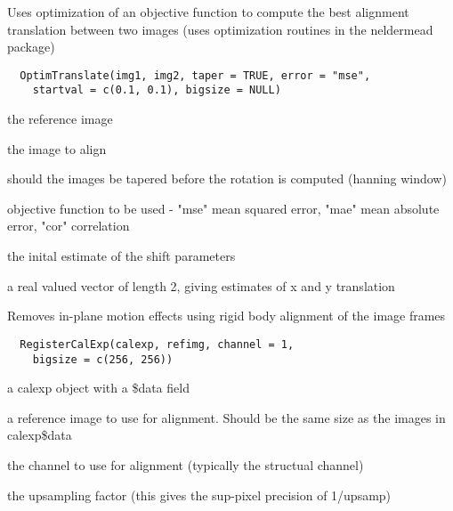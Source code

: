 \documentclass[a4paper]{book}
\begin{document}
%
\begin{Description}\relax
Uses optimization of an objective function to compute the
best alignment translation between two images (uses
optimization routines in the neldermead package)
\end{Description}
%
\begin{Usage}
\begin{verbatim}
  OptimTranslate(img1, img2, taper = TRUE, error = "mse",
    startval = c(0.1, 0.1), bigsize = NULL)
\end{verbatim}
\end{Usage}
%
\begin{Arguments}
\begin{ldescription}
\item[\code{img1}] the reference image

\item[\code{img2}] the image to align

\item[\code{taper}] should the images be tapered before the
rotation is computed (hanning window)

\item[\code{error}] objective function to be used - "mse" mean
squared error, "mae" mean absolute error, "cor"
correlation

\item[\code{startval}] the inital estimate of the shift
parameters
\end{ldescription}
\end{Arguments}
%
\begin{Value}
a real valued vector of length 2, giving estimates of x
and y translation
\end{Value}
%
\begin{Description}\relax
Removes in-plane motion effects using rigid body
alignment of the image frames
\end{Description}
%
\begin{Usage}
\begin{verbatim}
  RegisterCalExp(calexp, refimg, channel = 1,
    bigsize = c(256, 256))
\end{verbatim}
\end{Usage}
%
\begin{Arguments}
\begin{ldescription}
\item[\code{calexp}] a calexp object with a \bsl{}\$data field

\item[\code{refimg}] a reference image to use for alignment.
Should be the same size as the images in calexp\bsl{}\$data

\item[\code{channel}] the channel to use for alignment
(typically the structual channel)

\item[\code{upsamp}] the upsampling factor (this gives the
sup-pixel precision of 1/upsamp)
\end{ldescription}
\end{Arguments}
\end{document}
